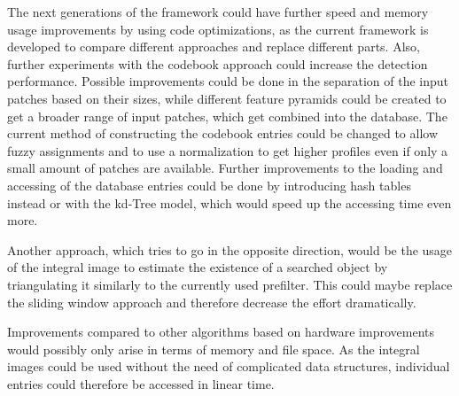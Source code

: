 The next generations of the framework could have further speed and memory usage improvements by using code optimizations, as the current framework is developed to compare different approaches and replace different parts. Also, further experiments with the codebook approach could increase the detection performance. Possible improvements could be done in the separation of the input patches based on their sizes, while different feature pyramids could be created to get a broader range of input patches, which get combined into the database. The current method of constructing the codebook entries could be changed to allow fuzzy assignments and to use a normalization to get higher profiles even if only a small amount of patches are available. Further improvements to the loading and accessing of the database entries could be done by introducing hash tables instead or with the kd-Tree model, which would speed up the accessing time even more.

Another approach, which tries to go in the opposite direction, would be the usage of the integral image to estimate the existence of a searched object by triangulating it similarly to the currently used prefilter. This could maybe replace the sliding window approach and therefore decrease the effort dramatically.

Improvements compared to other algorithms based on hardware improvements would possibly only arise in terms of memory and file space. As the integral images could be used without the need of complicated data structures, individual entries could therefore be accessed in linear time.